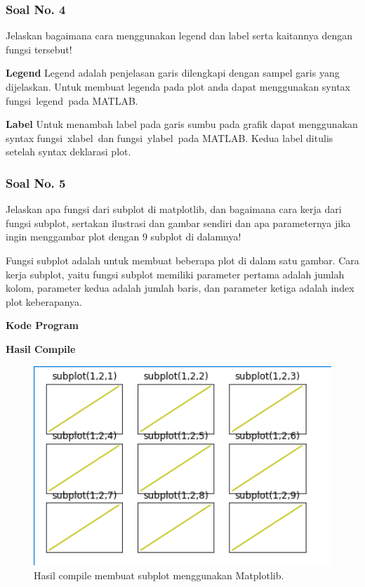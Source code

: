 \subsubsection{Soal No. 4}
\hfill \break
Jelaskan bagaimana cara menggunakan legend dan label serta kaitannya dengan fungsi tersebut!

\textbf{Legend}
Legend adalah penjelasan garis dilengkapi dengan sampel garis yang dijelaskan. Untuk membuat legenda pada plot anda dapat menggunakan syntax fungsi legend pada MATLAB. 

\textbf{Label}
Untuk menambah label pada garis sumbu pada grafik dapat menggunakan syntax fungsi xlabel dan fungsi ylabel pada MATLAB. Kedua label ditulis setelah syntax deklarasi plot.

\subsubsection{Soal No. 5}
\hfill \break
Jelaskan apa fungsi dari subplot di matplotlib, dan bagaimana cara kerja dari fungsi subplot, sertakan ilustrasi dan gambar sendiri dan apa parameternya jika ingin menggambar plot dengan 9 subplot di dalamnya!

\hfill \break
Fungsi subplot adalah untuk membuat beberapa plot di dalam satu gambar.
\hfill \break
Cara kerja subplot, yaitu fungsi subplot memiliki parameter pertama adalah jumlah kolom, parameter kedua adalah jumlah baris, dan parameter ketiga adalah index plot keberapanya.

\hfill \break
\textbf{Kode Program}



\hfill \break
\textbf{Hasil Compile}

\begin{figure}[H]
	\includegraphics[width=12cm]{figures/6/1174031/subplot.png}
	\centering
	\caption{Hasil compile membuat subplot menggunakan Matplotlib.}
\end{figure}

